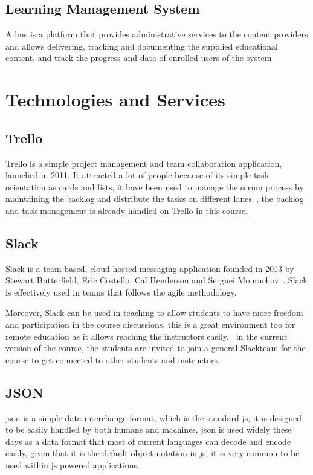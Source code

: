 \subsection{Learning Management System}
\label{sub:lms}

A \ac{lms} is a platform that provides administrative services to the content providers and allows delivering, tracking and
documenting the supplied educational content, and track the progress and data of enrolled users of the system~\cite{lms_1}


\section{Technologies and Services}
\label{sec:technologies}

\subsection{Trello\texttrademark{}}
\label{sub:trello}
Trello\texttrademark{} is a simple project management and team collaboration application, launched in 2011\cite{rao_2011}. It attracted a lot
of people because of its simple task orientation as cards and lists, it have been used to manage the scrum process by maintaining the backlog
and distribute the tasks on different lanes~\cite{trello_scrum}\cite{trello_scrum_2}, the backlog and task management is already handled
on Trello\texttrademark{} in this course.

\subsection{Slack\texttrademark{}}
\label{sub:slack}
Slack\texttrademark{} is a team based, cloud hosted messaging application founded in 2013 by Stewart Butterfield, Eric Costello, Cal Henderson
and Serguei Mourachov~\cite{kumparak_2015}. Slack\texttrademark{} is effectively used in teams that follows the agile methodology.

\newParagraph
Moreover, Slack can be used in teaching to allow students to have more freedom and participation in the course discussions, this is a
great environment too for remote education as it allows reaching the instructors easily,~\cite{medium_slack_2015}\cite{slack_education} in the current
version of the course, the students are invited to join a general Slack\texttrademark team for the course to get connected to
other students and instructors.

\subsection{JSON}
\label{sub:json}
\ac{json} is a simple data interchange format, which is the standard \ac{js}, it is designed to be easily handled by both humans and machines.
\ac{json} is used widely these days as a data format that most of current languages can decode and encode easily, given that it is the default
object notation in \ac{js}, it is very common to be used within \ac{js} powered applications.~\cite{json}


